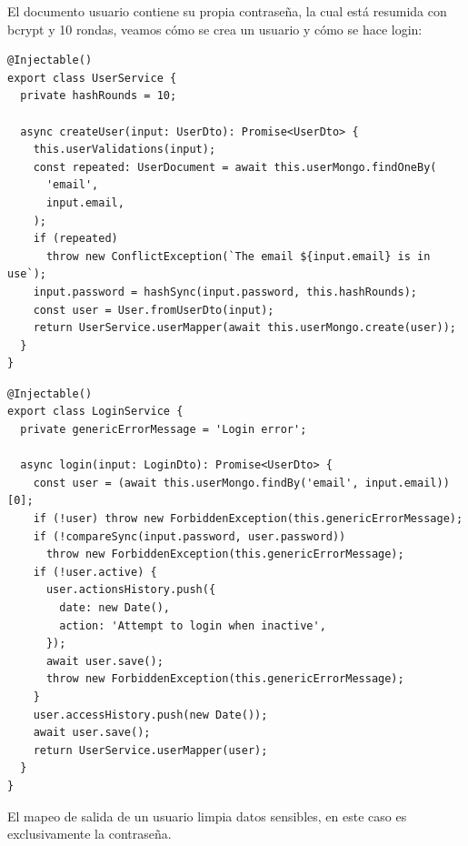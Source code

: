 \vspace{1em}
\par El documento usuario contiene su propia contraseña, la cual está resumida con bcrypt y 10 rondas, veamos cómo se crea un usuario y cómo se hace login:
\vspace{1em}
\par 
\begin{lstlisting}[caption={Creación de un usuario},label=cod:service-user-creation]
@Injectable()
export class UserService {
  private hashRounds = 10;

  async createUser(input: UserDto): Promise<UserDto> {
    this.userValidations(input);
    const repeated: UserDocument = await this.userMongo.findOneBy(
      'email',
      input.email,
    );
    if (repeated)
      throw new ConflictException(`The email ${input.email} is in use`);
    input.password = hashSync(input.password, this.hashRounds);
    const user = User.fromUserDto(input);
    return UserService.userMapper(await this.userMongo.create(user));
  }
}
\end{lstlisting}
\vspace{1em}
\par 
\begin{lstlisting}[caption={Login de un usuario},label=cod:service-user-login]
@Injectable()
export class LoginService {
  private genericErrorMessage = 'Login error';

  async login(input: LoginDto): Promise<UserDto> {
    const user = (await this.userMongo.findBy('email', input.email))[0];
    if (!user) throw new ForbiddenException(this.genericErrorMessage);
    if (!compareSync(input.password, user.password))
      throw new ForbiddenException(this.genericErrorMessage);
    if (!user.active) {
      user.actionsHistory.push({
        date: new Date(),
        action: 'Attempt to login when inactive',
      });
      await user.save();
      throw new ForbiddenException(this.genericErrorMessage);
    }
    user.accessHistory.push(new Date());
    await user.save();
    return UserService.userMapper(user);
  }
}
\end{lstlisting}
\vspace{1em}
\par El mapeo de salida de un usuario limpia datos sensibles, en este caso es exclusivamente la contraseña.
\clearpage


